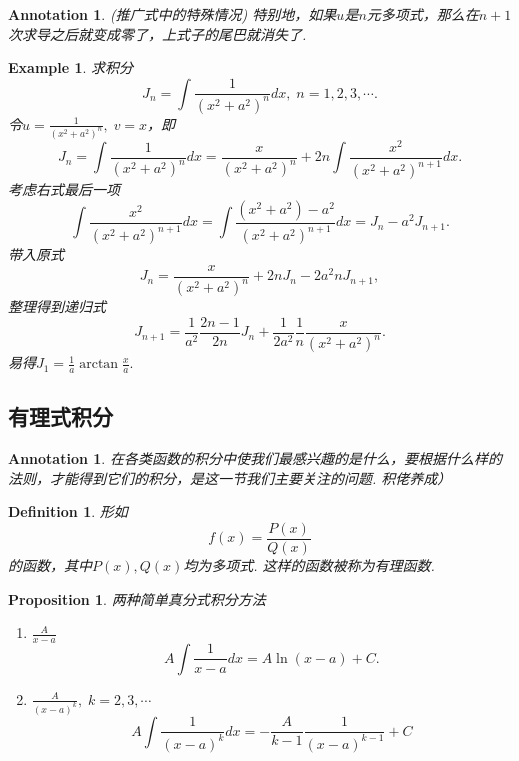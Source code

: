 \documentclass{article}
\newtheorem{proposition}[theorem]{Proposition}
\newtheorem{example}[theorem]{Example}
\newtheorem{definition}[theorem]{Definition}
\newtheorem{annotation}[theorem]{Annotation}
\begin{document}
\begin{annotation}
\rm {\color{red} (推广式中的特殊情况) }特别地，如果$u$是$n$元多项式，那么在$n+1$次求导之后就变成零了，上式子的尾巴就消失了.
\end{annotation}

\begin{example}
\rm 求积分
$$
J_n = \int \frac{1}{(x^2+a^2)^n}dx,\; n =1,2,3,\cdots.
$$
令$u=\frac{1}{(x^2+a^2)^n},\; v = x$，即
$$
J_n = \int \frac{1}{(x^2+a^2)^n}dx = \frac{x}{(x^2+a^2)^n} + 2n \int \frac{x^2}{(x^2+a^2)^{n+1}}dx. 
$$
考虑右式最后一项
$$
\int \frac{x^2}{(x^2+a^2)^{n+1}}dx =\int \frac{(x^2+a^2) - a^2}{(x^2+a^2)^{n+1}}dx = J_n - a^2 J_{n+1}.
$$
带入原式
$$
J_n = \frac{x}{(x^2+a^2)^n}+2nJ_n - 2a^2nJ_{n+1},
$$
整理得到{\color{red}递归式}
$$
J_{n+1} = \frac{1}{a^2}\frac{2n-1}{2n}J_n + \frac{1}{2a^2}\frac{1}{n}\frac{x}{(x^2+a^2)^n}.
$$
易得$J_1 = \frac{1}{a} \arctan \frac{x}{a}.$ 
\end{example}

\subsection{有理式积分}

\begin{annotation}
\rm 在各类函数的积分中使我们{\color{red}最感兴趣的是什么}，要根据什么样的{\color{red}法则}，才能得到它们的积分，是这一节我们主要关注的问题. 积佬养成）
\end{annotation}

\begin{definition}
\rm 形如
$$
f(x)=\frac{P(x)}{Q(x)}
$$
的函数，其中$P(x),Q(x)$均为多项式. 这样的函数被称为{\color{red}有理函数}.
\end{definition}

\begin{proposition}
\rm 两种{\color{red}简单真分式}积分方法
\begin{enumerate}
	\item $\frac{A}{x-a}$
	$$
	A\int \frac{1}{x-a}dx = A \ln(x-a) + C.
	$$
	\item $\frac{A}{(x-a)^k},\; k = 2,3,\cdots$
	$$
	A\int \frac{1}{(x-a)^k}dx = -\frac{A}{k-1}\frac{1}{(x-a)^{k-1}} + C
	$$
\end{enumerate}
\end{proposition}
\end{document}
